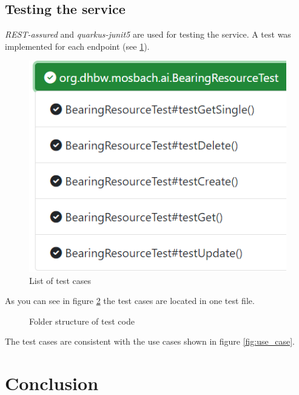     \section{Testing the service} \label{sec:testing}
        \textit{REST-assured} and \textit{quarkus-junit5} are used for testing the service. A test was implemented for each endpoint (see \ref{fig:testing}). 

        \begin{figure}[h]
            \centering
            \includegraphics{images/testing.png}
            \caption{List of test cases}
            \label{fig:testing}
        \end{figure}


        As you can see in figure \ref{fig:folder_test} the test cases are located in one test file.
        \begin{figure}[h]
            \caption{Folder structure of test code}
            \label{fig:folder_test}
        \end{figure}

        The test cases are consistent with the use cases shown in figure \ref{fig:use_case}.

        


\chapter{Conclusion} %

